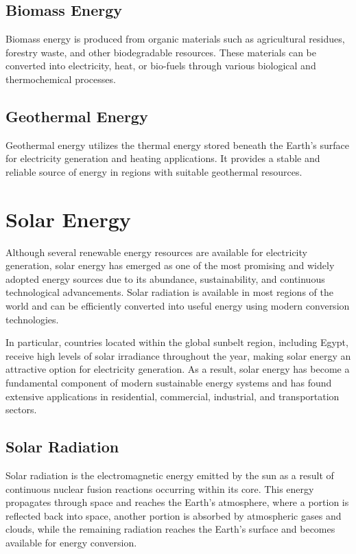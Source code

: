 \subsection{Biomass Energy}
Biomass energy is produced from organic materials such as agricultural residues, forestry waste, and other biodegradable resources. These materials can be converted into electricity, heat, or bio-fuels through various biological and thermochemical processes.

\subsection{Geothermal Energy}
Geothermal energy utilizes the thermal energy stored beneath the Earth’s surface for electricity generation and heating applications. It provides a stable and reliable source of energy in regions with suitable geothermal resources.

\section{Solar Energy}
Although several renewable energy resources are available for electricity generation, solar energy has emerged as one of the most promising and widely adopted energy sources due to its abundance, sustainability, and continuous technological advancements. Solar radiation is available in most regions of the world and can be efficiently converted into useful energy using modern conversion technologies.

In particular, countries located within the global sunbelt region, including Egypt, receive high levels of solar irradiance throughout the year, making solar energy an attractive option for electricity generation. As a result, solar energy has become a fundamental component of modern sustainable energy systems and has found extensive applications in residential, commercial, industrial, and transportation sectors.

\subsection{Solar Radiation}
Solar radiation is the electromagnetic energy emitted by the sun as a result of continuous nuclear fusion reactions occurring within its core. This energy propagates through space and reaches the Earth’s atmosphere, where a portion is reflected back into space, another portion is absorbed by atmospheric gases and clouds, while the remaining radiation reaches the Earth’s surface and becomes available for energy conversion.


